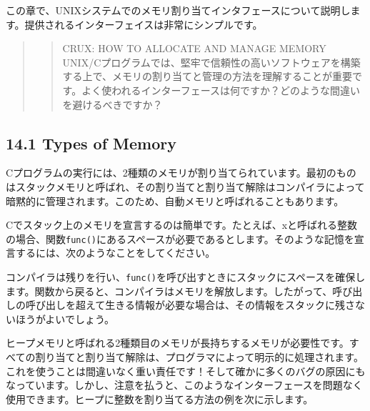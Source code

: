 この章で、UNIXシステムでのメモリ割り当てインタフェースについて説明します。提供されるインターフェイスは非常にシンプルです。

\begin{quote}
\begin{quote}
CRUX: HOW TO ALLOCATE AND MANAGE MEMORY\\
UNIX/Cプログラムでは、堅牢で信頼性の高いソフトウェアを構築する上で、メモリの割り当てと管理の方法を理解することが重要です。よく使われるインターフェースは何ですか？どのような間違いを避けるべきですか？
\end{quote}
\end{quote}

\hypertarget{types-of-memory}{%
\subsection*{14.1 Types of Memory}\label{types-of-memory}}

Cプログラムの実行には、2種類のメモリが割り当てられています。最初のものはスタックメモリと呼ばれ、その割り当てと割り当て解除はコンパイラによって暗黙的に管理されます。このため、自動メモリと呼ばれることもあります。

Cでスタック上のメモリを宣言するのは簡単です。たとえば、xと呼ばれる整数の場合、関数\texttt{func()}にあるスペースが必要であるとします。そのような記憶を宣言するには、次のようなことをしてください。

\begin{Shaded}
\begin{Highlighting}[]
\NormalTok{\}}
\end{Highlighting}
\end{Shaded}

コンパイラは残りを行い、\texttt{func()}を呼び出すときにスタックにスペースを確保します。関数から戻ると、コンパイラはメモリを解放します。したがって、呼び出しの呼び出しを超えて生きる情報が必要な場合は、その情報をスタックに残さないほうがよいでしょう。

ヒープメモリと呼ばれる2種類目のメモリが長持ちするメモリが必要性です。すべての割り当てと割り当て解除は、プログラマによって明示的に処理されます。これを使うことは間違いなく重い責任です！そして確かに多くのバグの原因にもなっています。しかし、注意を払うと、このようなインターフェースを問題なく使用できます。ヒープに整数を割り当てる方法の例を次に示します。

\begin{Shaded}
\begin{Highlighting}[]
\NormalTok{(}\NormalTok{));}
\NormalTok{\}}
\end{Highlighting}
\end{Shaded}

